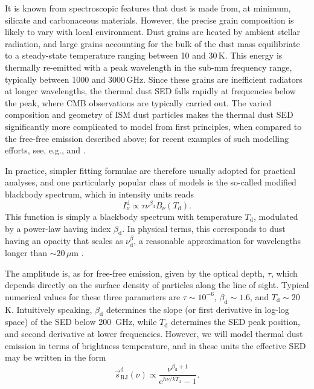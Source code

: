 \documentclass[twocolumn]{aa}
\newcommand{\s}[0]{\vec{s}}
\newcommand{\e}{\mathrm e}
\begin{document}
It is known from spectroscopic features that dust is made from, at
minimum, silicate and carbonaceous materials. However, the precise
grain composition is likely to vary with local environment. Dust
grains are heated by ambient stellar radiation, and large grains
accounting for the bulk of the dust mass equilibriate to a
steady-state temperature ranging between 10 and 30\,K. This energy is
thermally re-emitted with a peak wavelength in the sub-mm frequency
range, typically between 1000 and 3000\,GHz. Since these grains are
inefficient radiators at longer wavelengths, the thermal dust SED
falls rapidly at frequencies below the peak, where CMB observations
are typically carried out.  The varied composition and geometry of ISM
dust particles makes the thermal dust SED significantly more
complicated to model from first principles, when compared to the
free-free emission described above; for recent examples of such
modelling efforts, see, e.g., \citet{guillet2018} and
\citet{Hensley2022}.

In practice, simpler fitting formulae are
therefore usually adopted for practical analyses, and one particularly
popular class of models is the so-called modified blackbody
spectrum, which in intensity units reads
\begin{equation}
I^{\mathrm{d}}_{\nu} \propto \tau \nu^{\beta_{\mathrm{d}}} B_{\nu}(T_{\mathrm{d}}).
\end{equation}
This function is simply a blackbody spectrum with temperature
$T_{\mathrm{d}}$, modulated by a power-law having index
$\beta_{\mathrm{d}}$. In physical terms, this corresponds to dust having
an opacity that scales as $\nu^\beta_{\mathrm{d}}$, a reasonable approximation
for wavelengths longer than $\sim20\,\mu$m \citep{Hensley2020}.

The amplitude is, as for free-free emission,
given by the optical depth, $\tau$, which depends directly on the
surface density of particles along the line of sight. Typical
numerical values for these three parameters are $\tau \sim 10^{-6}$, 
$\beta_{\mathrm{d}}\sim 1.6$, and
$T_{\mathrm{d}}\sim20\,$K. Intuitively speaking, $\beta_{\mathrm{d}}$
determines the slope (or first derivative in log-log space)
of the SED below 200~GHz, while $T_{\mathrm{d}}$ determines the SED
peak position, and second derivative at lower frequencies. However, we
will model thermal dust emission in terms of brightness
temperature, and in these units the effective SED may be written in
the form
\begin{equation}
\s^{\mathrm{d}}_{\mathrm{RJ}}(\nu) \propto
\frac{\nu^{\beta_{\mathrm{d}}+1}}{\e^{h\nu/kT_{\mathrm{d}}}-1}. 
\end{equation}
\end{document}
